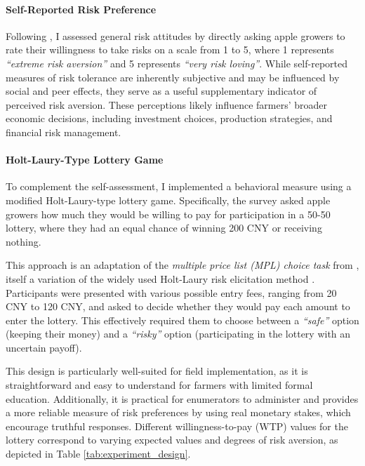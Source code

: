 \documentclass[12pt]{article}
\begin{document}
\paragraph{Self-Reported Risk Preference}
Following \cite{dohmen2011individual}, I assessed general risk attitudes by directly asking apple growers to rate their willingness to take risks on a scale from 1 to 5, where 1 represents \textit{``extreme risk aversion''} and 5 represents \textit{``very risk loving''}. While self-reported measures of risk tolerance are inherently subjective and may be influenced by social and peer effects, they serve as a useful supplementary indicator of perceived risk aversion. These perceptions likely influence farmers' broader economic decisions, including investment choices, production strategies, and financial risk management. 

\paragraph{Holt-Laury-Type Lottery Game}
To complement the self-assessment, I implemented a behavioral measure using a modified Holt-Laury-type lottery game. Specifically, the survey asked apple growers how much they would be willing to pay for participation in a 50-50 lottery, where they had an equal chance of winning 200 CNY or receiving nothing. 

This approach is an adaptation of the \textit{multiple price list (MPL) choice task} from \cite{brick2012risk}, itself a variation of the widely used Holt-Laury risk elicitation method \citep{holt2002risk}. Participants were presented with various possible entry fees, ranging from 20 CNY to 120 CNY, and asked to decide whether they would pay each amount to enter the lottery. This effectively required them to choose between a \textit{``safe''} option (keeping their money) and a \textit{``risky''} option (participating in the lottery with an uncertain payoff). 

This design is particularly well-suited for field implementation, as it is straightforward and easy to understand for farmers with limited formal education. Additionally, it is practical for enumerators to administer and provides a more reliable measure of risk preferences by using real monetary stakes, which encourage truthful responses. Different willingness-to-pay (WTP) values for the lottery correspond to varying expected values and degrees of risk aversion, as depicted in Table \ref{tab:experiment_design}.
\end{document}
